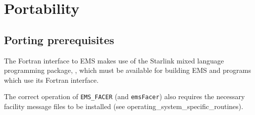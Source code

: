 \documentclass[twoside,11pt]{starlink}
\begin{document}
\newpage
\section{Portability}

\subsection{Porting prerequisites}
The Fortran interface to EMS makes use of the Starlink mixed language
programming package,
,
which must be available for building EMS and programs which use its Fortran
interface.

The correct operation of \texttt{EMS\_FACER} (and \texttt{emsFacer}) also
requires the necessary facility message files to be installed (see
{operating_system_specific_routines}).
\end{document}
